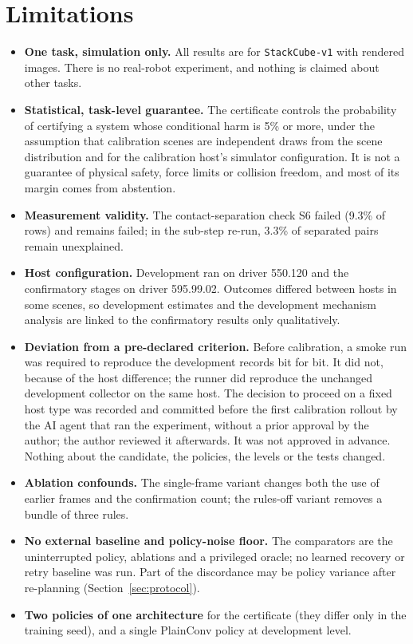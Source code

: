 \section{Limitations}\label{sec:limits}

\begin{itemize}
\item \textbf{One task, simulation only.} All results are for \texttt{StackCube-v1} with rendered images. There is no real-robot experiment, and nothing is claimed about other tasks.
\item \textbf{Statistical, task-level guarantee.} The certificate controls the probability of certifying a system whose conditional harm is 5\% or more, under the assumption that calibration scenes are independent draws from the scene distribution and for the calibration host's simulator configuration. It is not a guarantee of physical safety, force limits or collision freedom, and most of its margin comes from abstention.
\item \textbf{Measurement validity.} The contact-separation check S6 failed (9.3\% of rows) and remains failed; in the sub-step re-run, 3.3\% of separated pairs remain unexplained.
\item \textbf{Host configuration.} Development ran on driver 550.120 and the confirmatory stages on driver 595.99.02. Outcomes differed between hosts in some scenes, so development estimates and the development mechanism analysis are linked to the confirmatory results only qualitatively.
\item \textbf{Deviation from a pre-declared criterion.} Before calibration, a smoke run was required to reproduce the development records bit for bit. It did not, because of the host difference; the runner did reproduce the unchanged development collector on the same host. The decision to proceed on a fixed host type was recorded and committed before the first calibration rollout by the AI agent that ran the experiment, without a prior approval by the author; the author reviewed it afterwards. It was not approved in advance. Nothing about the candidate, the policies, the levels or the tests changed.
\item \textbf{Ablation confounds.} The single-frame variant changes both the use of earlier frames and the confirmation count; the rules-off variant removes a bundle of three rules.
\item \textbf{No external baseline and policy-noise floor.} The comparators are the uninterrupted policy, ablations and a privileged oracle; no learned recovery or retry baseline was run. Part of the discordance may be policy variance after re-planning (Section~\ref{sec:protocol}).
\item \textbf{Two policies of one architecture} for the certificate (they differ only in the training seed), and a single PlainConv policy at development level.
\end{itemize}
